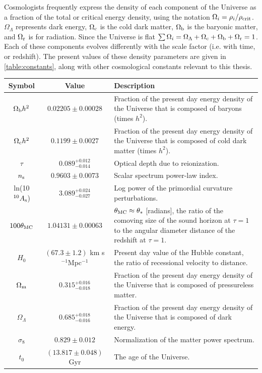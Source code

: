 Cosmologists frequently express the density of each component of the Universe as a fraction of the total or critical energy density, using the notation $\Omega_i = \rho_i / \rho_{\rm crit}$. $\Omega_{\Lambda}$ represents dark energy, $\Omega_{\rm c}$ is the cold dark matter, $\Omega_{\rm b}$ is the baryonic matter, and $\Omega_{\rm r}$ is for radiation. Since the Universe is flat $\sum \Omega_i = \Omega_{\Lambda} + \Omega_{\rm c} + \Omega_{\rm b} + \Omega_{\rm r} =1$. Each of these components evolves differently with the scale factor (i.e. with time, or redshift). The present values of these density parameters are given in \autoref{table:constants}, along with other cosmological constants relevant to this thesis.


\begin{table}%
 \begin{center}
    \begin{tabular}{|c|c|p{10cm}|}

      \hline
      Symbol & Value & Description \\ \hline \hline

      $\Omega_{\rm b}h^2$ & $0.02205\pm0.00028$ & Fraction of the present day energy density of the Universe that is composed of baryons (times $h^2$). \\ \hline
      $\Omega_{\rm c}h^2$ & $0.1199\pm0.0027$ & Fraction of the present day energy density of the Universe that is composed of cold dark matter (times $h^2$). \\ \hline
      $\tau$ & $0.089^{+0.012}_{-0.014}$ & Optical depth due to reionization. \\ \hline
      $n_{\rm s}$ & $0.9603\pm0.0073$ & Scalar spectrum power-law index. \\ \hline
      ln(10$^{10}A_{\rm s}$) & $3.089^{+0.024}_{-0.027}$ & Log power of the primordial curvature perturbations. \\ \hline 
      $100\theta_{\rm MC}$ & $1.04131\pm0.00063$ & $\theta_{\rm MC} \approx \theta_*$ [radians], the ratio of the comoving size of the sound horizon at $\tau=1$ to the angular diameter distance of the redshift at $\tau=1$. \\ \hline \hline 

      $H_0$ & $(67.3\pm1.2)$ km s$^{-1}$Mpc$^{-1}$ & Present day value of the Hubble constant, the ratio of recessional velocity to distance. \\ \hline
      $\Omega_{\rm m}$ & $0.315^{+0.016}_{-0.018}$ & Fraction of the present day energy density of the Universe that is composed of pressureless matter. \\ \hline
      $\Omega_{\Lambda}$ & $0.685^{+0.018}_{-0.016}$ & Fraction of the present day energy density of the Universe that is composed of dark energy. \\ \hline
      $\sigma_8$ & $0.829\pm0.012$ & Normalization of the matter power spectrum. \\ \hline
      $t_0$ & $(13.817\pm0.048)$ Gyr & The age of the Universe. \\ \hline


\end{tabular}
\end{center}
\end{table}
